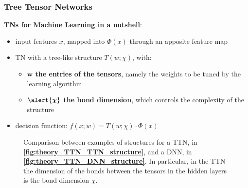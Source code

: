 \documentclass[xcolor=table,8pt]{beamer}
\begin{document}
    
    \begin{frame}[t]
        \frametitle{Tree Tensor Networks}
        
        \textbf{TNs for Machine Learning in a nutshell}:
        \begin{itemize}
            \item input features \( x \), mapped into \( \Phi(x) \) through an apposite feature map
            \item TN with a tree-like structure \( T(w;\chi) \), with:
            \begin{itemize}
                \item \textbf{\( \boldsymbol{w} \) the entries of the tensors}, namely the weights to be tuned by the learning algorithm
                \item \textbf{\( \alert{\boldsymbol{\chi}} \) the bond dimension}, which controls the complexity of the structure
            \end{itemize}
            \item decision function: \alert{\( f(x;w) = T(w;\chi) \cdot \Phi(x) \)}
        \end{itemize}

        \begin{figure}[!h]
            \begin{minipage}[c]{0.50\linewidth}
                \vspace{0pt}
                \centering
            \end{minipage}%
            \begin{minipage}[c]{0.50\linewidth}
                \vspace{0pt}
                \centering
            \end{minipage}%
            \caption{Comparison between examples of structures for a TTN, in \textbf{\ref{fig:theory_TTN_TTN_structure}}, and a DNN, in \textbf{\ref{fig:theory_TTN_DNN_structure}}. In particular, in the TTN the dimension of the bonds between the tensors in the hidden layers is the bond dimension \( \chi \).}
            \label{fig:theory_TTN_TTN_DNN_structures}
        \end{figure}
    \end{frame}
    
\end{document}
